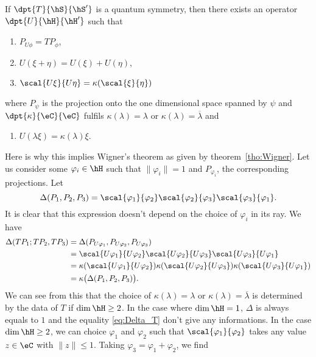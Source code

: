 \begin{theorem}
	If $\dpt{T}{\hS}{\hS'}$ is a quantum symmetry, then there exists an operator $\dpt{U}{\hH}{\hH'}$ such that
	\begin{enumerate}
		\item $P_{U\phi}=TP_{\phi}$,
		\item $U(\xi+\eta)=U(\xi)+U(\eta)$,
		\item $\scal{U\xi}{U\eta}=\kappa(\scal{\xi}{\eta})$ \label{item:cond_3}
	\end{enumerate}
	where $P_{\psi}$ is the projection onto the one dimensional space spanned by $\psi$ and $\dpt{\kappa}{\eC}{\eC}$ fulfils $\kappa(\lambda)=\lambda$ or $\kappa(\lambda)=\overline{\lambda}$ and

	\begin{enumerate}
		\item $U(\lambda\xi)=\kappa(\lambda)\xi$.
	\end{enumerate}
	\label{tho:pre_Wigner}
\end{theorem}
Here is why this implies Wigner's theorem as given by theorem~\ref{tho:Wigner}. Let us consider some $\varphi_i\in\hH$ such that $\|\varphi_i\|=1$ and $P_{\varphi_i}$, the corresponding projections. Let
\[
	\Delta(P_1,P_2,P_3)=\scal{\varphi_1}{\varphi_2}\scal{\varphi_2}{\varphi_3}\scal{\varphi_3}{\varphi_1}.
\]
It is clear that this expression doesn't depend on the choice of $\varphi_i$ in its ray. We have
\begin{equation}\label{eq:Delta_T}
	\begin{split}
		\Delta(TP_1;TP_2,TP_3)&=\Delta(P_{U\varphi_1},P_{U\varphi_2},P_{U\varphi_3})\\
		&=\scal{U\varphi_1}{U\varphi_2}\scal{U\varphi_2}{U\varphi_3}\scal{U\varphi_3}{U\varphi_1}\\
		&=\kappa(\scal{U\varphi_1}{U\varphi_2})\kappa(\scal{U\varphi_2}{U\varphi_3})\kappa(\scal{U\varphi_3}{U\varphi_1})\\
		&=\kappa\big(\Delta(P_1,P_2,P_3)\big).
	\end{split}
\end{equation}
We can see from this that the choice of $\kappa(\lambda)=\lambda$ or $\kappa(\lambda)=\overline{\lambda}$ is determined by the data of $T$ if $\dim\hH\geq 2$. In the case where $\dim\hH=1$, $\Delta$ is always equals to $1$ and the equality \eqref{eq:Delta_T} don't give any informations. In the case $\dim\hH\geq 2$, we can choice $\varphi_1$ and $\varphi_2$ such that $\scal{\varphi_1}{\varphi_2}$ takes any value $z\in\eC$ with $\|z\|\leq 1$. Taking $\varphi_3=\varphi_1+\varphi_2$, we find
